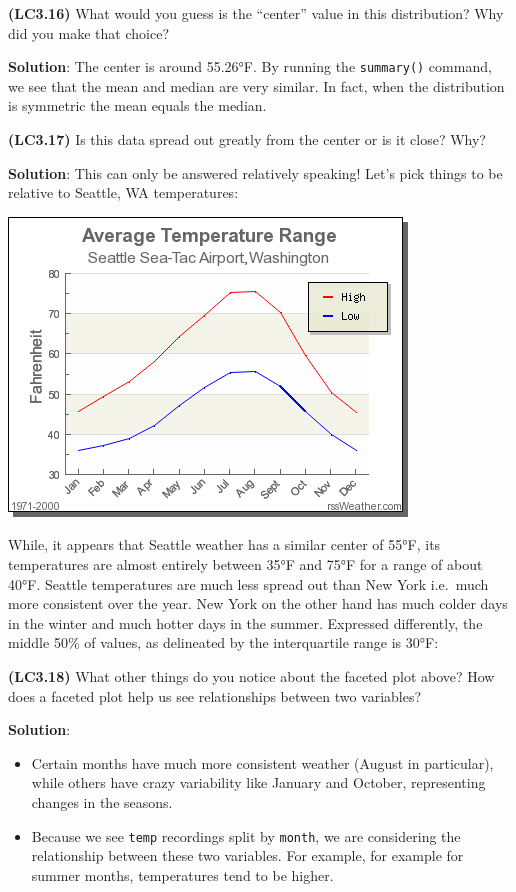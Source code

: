 \documentclass[12pt, krantz2,]{krantz}
\providecommand{\tightlist}{%
  \setlength{\itemsep}{0pt}\setlength{\parskip}{0pt}}
\begin{document}
\textbf{(LC3.16)} What would you guess is the ``center'' value in this distribution? Why did you make that choice?

\textbf{Solution}: The center is around 55.26°F. By running the \texttt{summary()} command, we see that the mean and median are very similar. In fact, when the distribution is symmetric the mean equals the median.

\textbf{(LC3.17)} Is this data spread out greatly from the center or is it close? Why?

\textbf{Solution}: This can only be answered relatively speaking! Let's pick things to be relative to Seattle, WA temperatures:

\includegraphics{images/temp.png}

While, it appears that Seattle weather has a similar center of 55°F, its
temperatures are almost entirely between 35°F and 75°F for a range of
about 40°F. Seattle temperatures are much less spread out than New York
i.e.~much more consistent over the year. New York on the other hand has much colder
days in the winter and much hotter days in the summer. Expressed differently,
the middle 50\% of values, as delineated by the interquartile range is 30°F:

\textbf{(LC3.18)} What other things do you notice about the faceted plot above? How does a faceted plot help us see relationships between two variables?

\textbf{Solution}:

\begin{itemize}
\tightlist
\item
  Certain months have much more consistent weather (August in particular), while others have crazy variability like January and October, representing changes in the seasons.
\item
  Because we see \texttt{temp} recordings split by \texttt{month}, we are considering the relationship between these two variables. For example, for example for summer months, temperatures tend to be higher.
\end{itemize}
\end{document}
